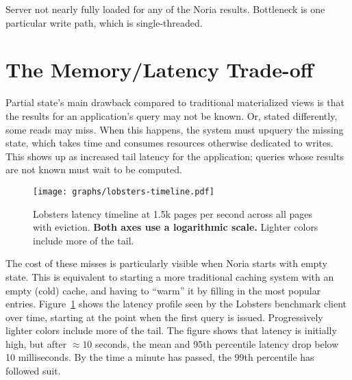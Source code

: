 \begin{inprogress}
  Server not nearly fully loaded for any of the Noria results. Bottleneck is one
  particular write path, which is single-threaded.
\end{inprogress}


\section{The Memory/Latency Trade-off}
\label{s:eval:cost}

Partial state's main drawback compared to traditional materialized views is
that the results for an application's query may not be known. Or, stated
differently, some reads may miss. When this happens, the system must upquery the
missing state, which takes time and consumes resources otherwise dedicated to
writes. This shows up as increased tail latency for the application; queries
whose results are not known must wait to be computed.

\begin{figure}[t]
  \centering
  \texttt{[image: graphs/lobsters-timeline.pdf]}
  \caption{Lobsters latency timeline at 1.5k pages per second across all pages
  with eviction. \textbf{Both axes use a logarithmic scale.} Lighter colors
  include more of the tail.}
  \label{f:lobsters-timeline}
\end{figure}

The cost of these misses is particularly visible when Noria starts with empty
state. This is equivalent to starting a more traditional caching system with an
empty (cold) cache, and having to ``warm'' it by filling in the most popular
entries. Figure~\ref{f:lobsters-timeline} shows the latency profile seen by the
Lobsters benchmark client over time, starting at the point when the first query
is issued. Progressively lighter colors include more of the tail. The figure
shows that latency is initially high, but after $\approx10$ seconds, the mean
and 95th percentile latency drop below 10 milliseconds. By the time a minute has
passed, the 99th percentile has followed suit.

